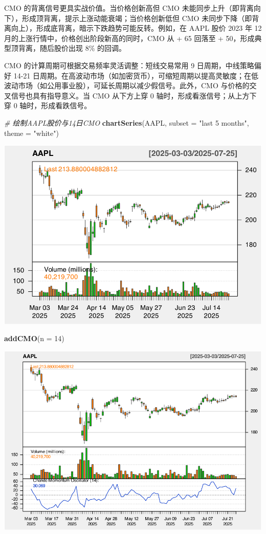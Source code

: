 \documentclass[]{ctexbook}
\newenvironment{Shaded}{\begin{snugshade}}{\end{snugshade}}
\newcommand{\AttributeTok}[1]{\textcolor[rgb]{0.13,0.29,0.53}{#1}}
\newcommand{\CommentTok}[1]{\textcolor[rgb]{0.56,0.35,0.01}{\textit{#1}}}
\newcommand{\DecValTok}[1]{\textcolor[rgb]{0.00,0.00,0.81}{#1}}
\newcommand{\FunctionTok}[1]{\textcolor[rgb]{0.13,0.29,0.53}{\textbf{#1}}}
\newcommand{\NormalTok}[1]{#1}
\newcommand{\StringTok}[1]{\textcolor[rgb]{0.31,0.60,0.02}{#1}}
\begin{document}
CMO 的背离信号更具实战价值。当价格创新高但 CMO 未能同步上升（即背离向下），形成顶背离，提示上涨动能衰竭；当价格创新低但 CMO 未同步下降（即背离向上），形成底背离，暗示下跌趋势可能反转。例如，在 AAPL 股价 2023 年 12 月的上涨行情中，价格创出阶段新高的同时，CMO 从 + 65 回落至 + 50，形成典型顶背离，随后股价出现 8\% 的回调。

CMO 的计算周期可根据交易频率灵活调整：短线交易常用 9 日周期，中线策略偏好 14-21 日周期。在高波动市场（如加密货币），可缩短周期以提高灵敏度；在低波动市场（如公用事业股），可延长周期以减少假信号。此外，CMO 与价格的交叉信号也具有指导意义。当 CMO 从下方上穿 0 轴时，形成看涨信号；从上方下穿 0 轴时，形成看跌信号。

\begin{Shaded}
\begin{Highlighting}[]
\CommentTok{\# 绘制AAPL股价与14日CMO}
\FunctionTok{chartSeries}\NormalTok{(AAPL, }\AttributeTok{subset =} \StringTok{"last 5 months"}\NormalTok{, }\AttributeTok{theme =} \StringTok{"white"}\NormalTok{)}
\end{Highlighting}
\end{Shaded}

\includegraphics[width=0.9\linewidth]{QuantmodHandbook_files/figure-latex/cmo-1}

\begin{Shaded}
\begin{Highlighting}[]
\FunctionTok{addCMO}\NormalTok{(}\AttributeTok{n =} \DecValTok{14}\NormalTok{)}
\end{Highlighting}
\end{Shaded}

\includegraphics[width=0.9\linewidth]{QuantmodHandbook_files/figure-latex/cmo-2}
\end{document}
